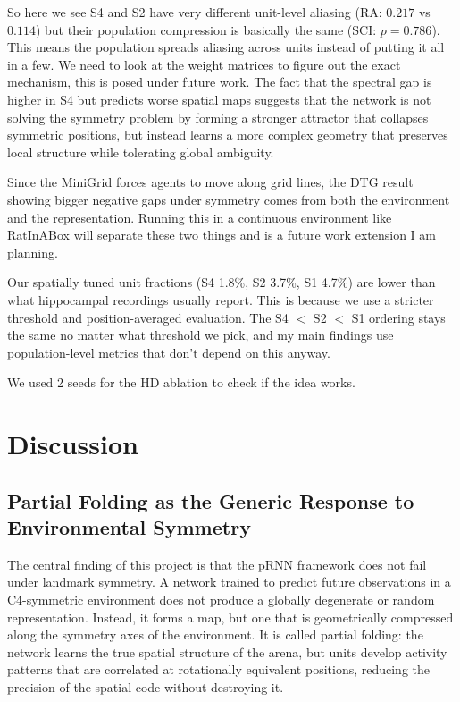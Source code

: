 ﻿\documentclass[11pt, a4paper]{article}
\begin{document}
So here we see S4 and S2 have very different unit-level aliasing (RA: $0.217$ vs $0.114$) but their population compression is basically the same (SCI: $p = 0.786$). This means the population spreads aliasing across units instead of putting it all in a few. We need to look at the weight matrices to figure out the exact mechanism, this is posed under future work. The fact that the spectral gap is higher in S4 but predicts worse spatial maps suggests that the network is not solving the symmetry problem by forming a stronger attractor that collapses symmetric positions, but instead learns a more complex geometry that preserves local structure while tolerating global ambiguity.

Since the MiniGrid forces agents to move along grid lines, the DTG result showing bigger negative gaps under symmetry comes from both the environment and the representation. Running this in a continuous environment like RatInABox will separate these two things and is a future work extension I am planning. 

Our spatially tuned unit fractions (S4 1.8\%, S2 3.7\%, S1 4.7\%) are lower than what hippocampal recordings usually report. This is because we use a stricter threshold and position-averaged evaluation. The S4 $<$ S2 $<$ S1 ordering stays the same no matter what threshold we pick, and my main findings use population-level metrics that don't depend on this anyway.

We used 2 seeds for the HD ablation to check if the idea works.

\section{Discussion}
\label{sec:discussion}

\subsection{Partial Folding as the Generic Response to Environmental Symmetry}

The central finding of this project is that the pRNN framework does not fail
under landmark symmetry. A network trained to
predict future observations in a C4-symmetric environment does not produce
a globally degenerate or random representation. Instead, it forms a map, but one that is geometrically compressed along the symmetry axes of
the environment. It is called partial folding: the network learns the true
spatial structure of the arena, but units develop activity patterns that
are correlated at rotationally equivalent positions, reducing the
precision of the spatial code without destroying it.
\end{document}

